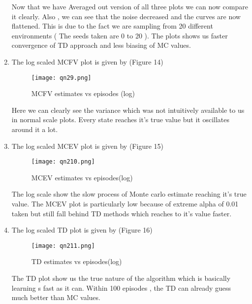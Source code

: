 \documentclass[a4 paper]{article}
\begin{document}
\begin{enumerate}
Now that we have Averaged out version of all three plots we can now compare it clearly. Also , we can see that the noise decreased and the curves are now flattened. This is due to the fact we are sampling from 20 different environments ( The seeds taken are 0 to 20 ). The plots shows us faster convergence of TD approach and less biasing of MC values.

\item The log scaled MCFV plot is given by (Figure 14)

\begin{figure}[h!]
    \centering
    \texttt{[image: qn29.png]}
    \caption{ MCFV estimates vs episodes (log)}
\end{figure}
 Here we can clearly see the variance which was not intuitively available to us in normal scale plots. Every state reaches it's true value but it oscillates around it a lot. 

\item The log scaled MCEV plot is given by (Figure 15)

\begin{figure}[h!]
    \centering
    \texttt{[image: qn210.png]}
    \caption{ MCEV estimates vs episodes(log)}
\end{figure}

The log scale show the slow process of Monte carlo estimate reaching it's true value. The MCEV plot is particularly low because of extreme alpha of 0.01 taken but still fall behind TD methods which reaches to it's value faster.

\item The log scaled TD plot is given by  (Figure 16)

\begin{figure}[h!]
    \centering
    \texttt{[image: qn211.png]}
    \caption{ TD estimates vs episodes(log)}
\end{figure}

The TD plot show us the true nature of the algorithm which is basically learning s fast as it can. Within 100 episodes , the TD can already guess much better than MC values. 


\end{enumerate}
\end{document}
